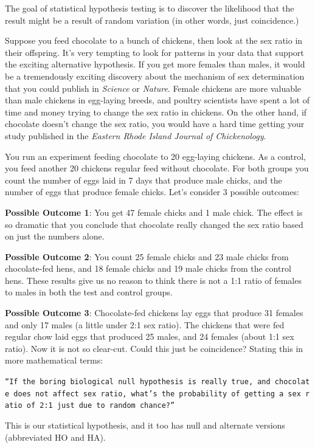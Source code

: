 \documentclass[
]{book}
\begin{document}
The goal of statistical hypothesis testing is to discover the likelihood that the result might be a result of random variation (in other words, just coincidence.)

Suppose you feed chocolate to a bunch of chickens, then look at the sex ratio in their offspring. It's very tempting to look for patterns in your data that support the exciting alternative hypothesis. If you get more females than males, it would be a tremendously exciting discovery about the mechanism of sex determination that you could publish in \emph{Science} or \emph{Nature}. Female chickens are more valuable than male chickens in egg-laying breeds, and poultry scientists have spent a lot of time and money trying to change the sex ratio in chickens. On the other hand, if chocolate doesn't change the sex ratio, you would have a hard time getting your study published in the \emph{Eastern Rhode Island Journal of Chickenology}.

You run an experiment feeding chocolate to 20 egg-laying chickens. As a control, you feed another 20 chickens regular feed without chocolate. For both groups you count the number of eggs laid in 7 days that produce male chicks, and the number of eggs that produce female chicks. Let's consider 3 possible outcomes:

\textbf{Possible Outcome 1}: You get 47 female chicks and 1 male chick. The effect is so dramatic that you conclude that chocolate really changed the sex ratio based on just the numbers alone.

\textbf{Possible Outcome 2}: You count 25 female chicks and 23 male chicks from chocolate-fed hens, and 18 female chicks and 19 male chicks from the control hens. These results give us no reason to think there is not a 1:1 ratio of females to males in both the test and control groups.

\textbf{Possible Outcome 3}: Chocolate-fed chickens lay eggs that produce 31 females and only 17 males (a little under 2:1 sex ratio). The chickens that were fed regular chow laid eggs that produced 25 males, and 24 females (about 1:1 sex ratio). Now it is not so clear-cut. Could this just be coincidence? Stating this in more mathematical terms:

\texttt{“If\ the\ boring\ biological\ null\ hypothesis\ is\ really\ true,\ and\ chocolate\ does\ not\ affect\ sex\ ratio,\ what’s\ the\ probability\ of\ getting\ a\ sex\ ratio\ of\ 2:1\ just\ due\ to\ random\ chance?”}

This is our statistical hypothesis, and it too has null and alternate versions (abbreviated HO and HA).
\end{document}
